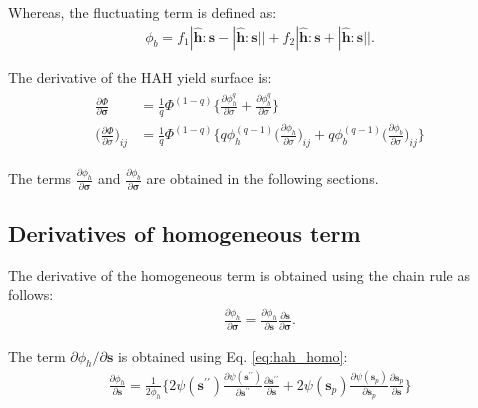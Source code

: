 \documentclass[12pt]{amsart}
\begin{document}
Whereas, the fluctuating term is defined as:
\begin{eqnarray}
    \label{eq:fluc}
\phi_b  = f_1|\hat{\mathbf{h}}:\mathbf{s} - |\hat{\mathbf{h}}:\mathbf{s}||    + f_2|\hat{\mathbf{h}}:\mathbf{s} + |\hat{\mathbf{h}}:\mathbf{s}||.
\end{eqnarray}

The derivative of the HAH yield surface is:
\begin{eqnarray}
  \begin{split}
  \label{eq:hah_deriv}
  \frac{\partial\Phi}{\partial\mathbf{\sigma}} &=\frac{1}{q}\Phi^{(1-q)} \bigg\{                  \frac{\partial{\phi_h^q}}{\partial{\sigma}}  +                 \frac{\partial{\phi_b^q}}{\partial{\sigma}}         \bigg\}\\
  \bigg(\frac{\partial\Phi}{\partial\sigma}\bigg)_{ij}&=\frac{1}{q}\Phi^{(1-q)} \bigg\{  q \phi_h^{(q-1)}\Big(\frac{\partial{\phi_h}  }{\partial{\sigma}}\Big)_{ij}  + q \phi_b^{(q-1)} \Big(\frac{\partial{\phi_b}  }{ \partial\sigma}\Big)_{ij}         \bigg\}
  \end{split}
\end{eqnarray}

The terms $\frac{\partial{\phi_h}  }{\partial{\mathbf{\sigma}}}$ and $\frac{\partial{\phi_b}  }{\partial{\mathbf{\sigma}}}$ are obtained in the following sections.


\subsection{Derivatives of homogeneous term}
\label{sec:2.1}


The derivative of the homogeneous term is obtained using the chain rule as follows:
\begin{eqnarray}
  \label{eq:derv1}
  \frac{\partial{\phi_h}  }{\partial{\mathbf{\sigma}}}  =   \frac{\partial{\phi_h}}{\partial{\mathbf{s}}} \frac{\partial{\mathbf{s}}}{\partial{\mathbf{\sigma}}}.
\end{eqnarray}

The term $\partial\phi_h/\partial \mathbf{s} $ is obtained using Eq. \ref{eq:hah_homo}:
\begin{eqnarray}
  \label{eq:derv2}
  \frac{\partial{\phi_h}  }{\partial{\mathbf{s}}} = \frac{1}{2\phi_h}\bigg\{ 2\psi(\mathbf{s}^{\prime\prime})\frac{\partial{\psi(\mathbf{s}^{\prime\prime})}}{\partial{\mathbf{s}^{\prime\prime}}}  \frac{\partial\mathbf{s}^{\prime\prime}}{\partial \mathbf{s}}  +  2\psi(\mathbf{s}_p) \frac{\partial{\psi(\mathbf{s}_p)}}{\partial{\mathbf{s}_p}} \frac{\partial{\mathbf{s}_p}}{\partial{\mathbf{s}}}\bigg\}
\end{eqnarray}
\end{document}
